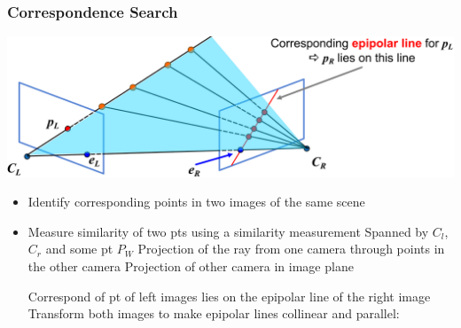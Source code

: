 \subsubsection{Correspondence Search}
\includegraphics[width=\linewidth]{./Figures/04_EpopolarPlan.png}
\begin{itemize}
    \item Identify corresponding points in two images of the same scene
    \item Measure similarity of two pts using a similarity measurement
     Spanned by $C_l$, $C_r$ and some pt $P_W$
     Projection of the ray from one camera through points in the other camera
     Projection of other camera in image plane
     Correspond of pt of left images lies on the epipolar line of the right image
     Transform both images to make epipolar lines collinear and parallel:
\end{itemize}

